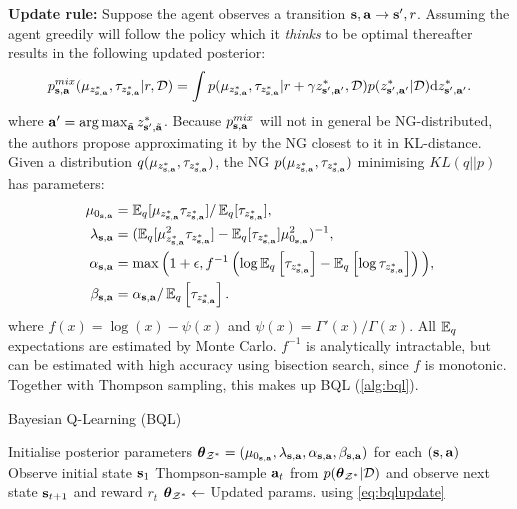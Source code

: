 \documentclass{article}
\begin{document}
\begin{appendices}
\textbf{Update rule:} Suppose the agent observes a transition $\s, \ac \to \ns, r$. Assuming the agent greedily will follow the policy which it \textit{thinks} to be optimal thereafter results in the following updated posterior:
\begin{align}\label{eq:mixture}
p^{mix}_{\s, \ac}(\bqlmu, \bqltau | r, \data) = \int p(\bqlmu, \bqltau | r + \gamma \zonb, \data) p(\zonb | \data) \dint \zonb.
\end{align}
where $\ac' = \argmax_{\tilde{\ac}} z^*_{\ns, \tilde{\ac}}$. Because $p^{mix}_{\s, \ac}$ will not in general be NG-distributed, the authors propose approximating it by the NG closest to it in KL-distance. Given a distribution $q(\bqlmu, \bqltau)$, the NG $p(\bqlmu, \bqltau)$ minimising $KL(q || p)$ has parameters:
\begin{equation}
\begin{aligned} \label{eq:bqlupdate}
\bqlmuzero &= \E_q[\bqlmu \bqltau] / \E_q[\bqltau], \\
\bqllambda &= (\E_q[\bqlmu^2 \bqltau] - \E_q[\bqltau] \mu_{0_{\s, \ac}}^2)^{-1},\\
\bqlalpha &= \max \Big(1 + \epsilon, f^{-1}\rdb{\log \E_q\sqb{\bqltau} - \E_q\sqb{\log \bqltau}}\Big), \\
\bqlbeta &= \bqlalpha / \E_q\sqb{\bqltau}.
\end{aligned}
\end{equation}
where $f(x) = \log(x) - \psi(x)$ and $\psi(x) = \Gamma'(x) / \Gamma(x)$. All $\E_q$ expectations are estimated by Monte Carlo. $f^{-1}$ is analytically intractable, but can be estimated with high accuracy using bisection search, since $f$ is monotonic. Together with Thompson sampling, this makes up BQL (\cref{alg:bql}).

\begin{algorithm}
  \caption{Bayesian Q-Learning (BQL)}\label{alg:bql}
  \begin{algorithmic}[1]
\State Initialise posterior parameters $\thetamczo = (\mu_{0_{\s, \ac}}, \lambda_{\s, \ac}, \alpha_{\s, \ac}, \beta_{\s, \ac})$ for each $(\s, \ac)$
 \State Observe initial state $\s_1$
  \State Thompson-sample $\ac_t$ from $p(\thetamczo | \data)$ and observe next state $\s_{t+1}$ and reward $r_t$
  \State $\thetamczo \leftarrow $ Updated params. using \cref{eq:bqlupdate}
 \EndFor
 \EndFor
  \end{algorithmic}
\end{algorithm}


\end{appendices}
\end{document}
